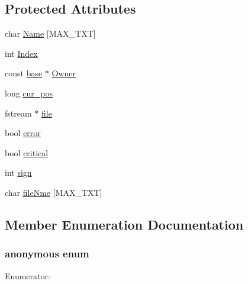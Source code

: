 \subsection*{Protected Attributes}
\begin{DoxyCompactItemize}
\item 
char \hyperlink{classbase_abd8f99d007cb1914c0837488829974ec}{Name} \mbox{[}MAX\_\-TXT\mbox{]}
\item 
int \hyperlink{classbase_afa59aaa1a0201700640234eb13a03aae}{Index}
\item 
const \hyperlink{classbase}{base} $\ast$ \hyperlink{classbase_a907869971a8ad022d6292922b1ff3bb5}{Owner}
\item 
long \hyperlink{classbase_a18c8507e30ab4a13349958492f90572e}{cur\_\-pos}
\item 
fstream $\ast$ \hyperlink{classbase_a3af52ee9891719d09b8b19b42450b6f6}{file}
\item 
bool \hyperlink{classbase_a72b1a293d5b28c566e45317bd28cdf30}{error}
\item 
bool \hyperlink{classbase_a54337c5388451d2200bfc4129e10114d}{critical}
\item 
int \hyperlink{classbase_aeccd588fec27112c3b58c91b7d6797da}{sign}
\item 
char \hyperlink{classbase_a350d087127f1d8ba8807eb521b6336fd}{fileNme} \mbox{[}MAX\_\-TXT\mbox{]}
\end{DoxyCompactItemize}


\subsection{Member Enumeration Documentation}
\hypertarget{classbase_aedb7805f64440b0f775949a1dbcf2f0e}{
\subsubsection[{"@0}]{\setlength{\rightskip}{0pt plus 5cm}anonymous enum}}
\label{classbase_aedb7805f64440b0f775949a1dbcf2f0e}
\begin{Desc}
\item[Enumerator: ]\par
\begin{description}
\item[{\em 
\hypertarget{classbase_aedb7805f64440b0f775949a1dbcf2f0ea768bca936198aad1beec3c138c1fe987}{
MAX\_\-TXT}
\label{classbase_aedb7805f64440b0f775949a1dbcf2f0ea768bca936198aad1beec3c138c1fe987}
}]\end{description}
\end{Desc}



